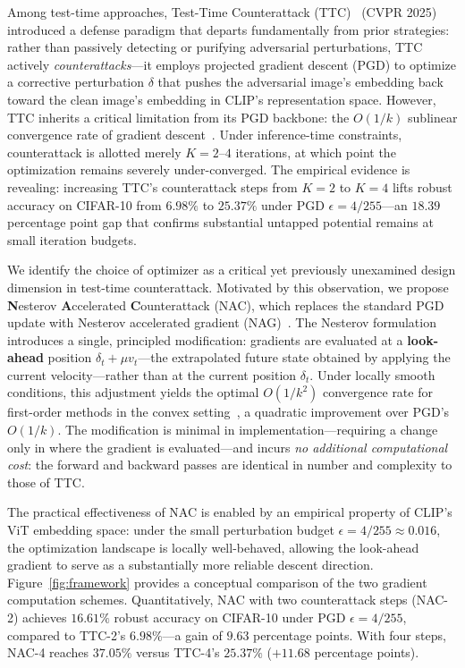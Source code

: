 \documentclass[12pt,a4paper]{article}
\begin{document}
Among test-time approaches, Test-Time Counterattack (TTC)~\cite{xing2025clip} (CVPR 2025) introduced a defense paradigm that departs fundamentally from prior strategies: rather than passively detecting or purifying adversarial perturbations, TTC actively \emph{counterattacks}---it employs projected gradient descent (PGD) to optimize a corrective perturbation $\delta$ that pushes the adversarial image's embedding back toward the clean image's embedding in CLIP's representation space. However, TTC inherits a critical limitation from its PGD backbone: the $O(1/k)$ sublinear convergence rate of gradient descent~\cite{nesterov1983method}. Under inference-time constraints, counterattack is allotted merely $K=2$--$4$ iterations, at which point the optimization remains severely under-converged. The empirical evidence is revealing: increasing TTC's counterattack steps from $K=2$ to $K=4$ lifts robust accuracy on CIFAR-10 from $6.98\%$ to $25.37\%$ under PGD $\epsilon = 4/255$---an $18.39$ percentage point gap that confirms substantial untapped potential remains at small iteration budgets.

We identify the choice of optimizer as a critical yet previously unexamined design dimension in test-time counterattack. Motivated by this observation, we propose \textbf{N}esterov \textbf{A}ccelerated \textbf{C}ounterattack (NAC), which replaces the standard PGD update with Nesterov accelerated gradient (NAG)~\cite{nesterov1983method}. The Nesterov formulation introduces a single, principled modification: gradients are evaluated at a \textbf{look-ahead} position $\delta_t + \mu v_t$---the extrapolated future state obtained by applying the current velocity---rather than at the current position $\delta_t$. Under locally smooth conditions, this adjustment yields the optimal $O(1/k^2)$ convergence rate for first-order methods in the convex setting~\cite{nesterov1983method}, a quadratic improvement over PGD's $O(1/k)$. The modification is minimal in implementation---requiring a change only in where the gradient is evaluated---and incurs \emph{no additional computational cost}: the forward and backward passes are identical in number and complexity to those of TTC.

The practical effectiveness of NAC is enabled by an empirical property of CLIP's ViT embedding space: under the small perturbation budget $\epsilon = 4/255 \approx 0.016$, the optimization landscape is locally well-behaved, allowing the look-ahead gradient to serve as a substantially more reliable descent direction. Figure~\ref{fig:framework} provides a conceptual comparison of the two gradient computation schemes. Quantitatively, NAC with two counterattack steps (NAC-2) achieves $16.61\%$ robust accuracy on CIFAR-10 under PGD $\epsilon=4/255$, compared to TTC-2's $6.98\%$---a gain of $9.63$ percentage points. With four steps, NAC-4 reaches $37.05\%$ versus TTC-4's $25.37\%$ ($+11.68$ percentage points).
\end{document}
